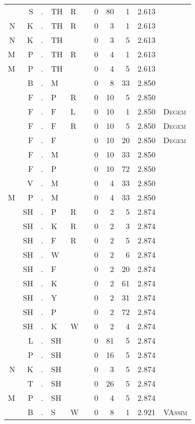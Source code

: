 \begin{longtable}{r@{ } r@{ } c@{ } l@{ } l@{ } l@{ } r r r r l }
  & S & . & TH & R &   & 0 & 80 & 1 & 2.613 &  \\
N & K & . & TH & R &   & 0 & 3 & 1 & 2.613 &  \\
N & K & . & TH &   &   & 0 & 3 & 5 & 2.613 &  \\
M & P & . & TH & R &   & 0 & 4 & 1 & 2.613 &  \\
M & P & . & TH &   &   & 0 & 4 & 5 & 2.613 &  \\
  & B & . & M &   &   & 0 & 8 & 33 & 2.850 &  \\
  & F & . & P & R &   & 0 & 10 & 5 & 2.850 &  \\
  & F & . & F & L &   & 0 & 10 & 1 & 2.850 & \textsc{Degem} \\
  & F & . & F & R &   & 0 & 10 & 5 & 2.850 & \textsc{Degem} \\
  & F & . & F &   &   & 0 & 10 & 20 & 2.850 & \textsc{Degem} \\
  & F & . & M &   &   & 0 & 10 & 33 & 2.850 &  \\
  & F & . & P &   &   & 0 & 10 & 72 & 2.850 &  \\
  & V & . & M &   &   & 0 & 4 & 33 & 2.850 &  \\
M & P & . & M &   &   & 0 & 4 & 33 & 2.850 &  \\
  & SH & . & P & R &   & 0 & 2 & 5 & 2.874 &  \\
  & SH & . & K & R &   & 0 & 2 & 3 & 2.874 &  \\
  & SH & . & F & R &   & 0 & 2 & 5 & 2.874 &  \\
  & SH & . & W &   &   & 0 & 2 & 6 & 2.874 &  \\
  & SH & . & F &   &   & 0 & 2 & 20 & 2.874 &  \\
  & SH & . & K &   &   & 0 & 2 & 61 & 2.874 &  \\
  & SH & . & Y &   &   & 0 & 2 & 31 & 2.874 &  \\
  & SH & . & P &   &   & 0 & 2 & 72 & 2.874 &  \\
  & SH & . & K & W &   & 0 & 2 & 4 & 2.874 &  \\
  & L & . & SH &   &   & 0 & 81 & 5 & 2.874 &  \\
  & P & . & SH &   &   & 0 & 16 & 5 & 2.874 &  \\
N & K & . & SH &   &   & 0 & 3 & 5 & 2.874 &  \\
  & T & . & SH &   &   & 0 & 26 & 5 & 2.874 &  \\
M & P & . & SH &   &   & 0 & 4 & 5 & 2.874 &  \\
  & B & . & S & W &   & 0 & 8 & 1 & 2.921 & \textsc{VAssim} \\

\end{longtable}
